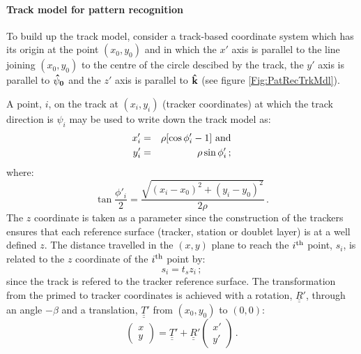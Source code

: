 \paragraph{Track model for pattern recognition}

To build up the track model, consider a track-based coordinate system
which has its origin at the point $(x_0, y_0)$ and in which the
$x'$ axis is parallel to the line joining $(x_0, y_0)$ to the
centre of the circle descibed by the track, the $y'$ axis is parallel
to ${\bf \hat{\psi}_0}$ and the $z'$ axis is parallel to 
${\bf \hat{k}}$ (see figure \ref{Fig:PatRecTrkMdl}).

A point, $i$, on the track at $(x_i, y_i)$ (tracker
coordinates) at which the track direction is $\psi_i$ may be used to
write down the track model as:
\begin{eqnarray}
  x'_i & = & \rho [ \cos\phi'_i - 1 ] {\rm~and} \\
  y'_i & = & \rho \sin\phi'_i \,;
\end{eqnarray}
where:
\begin{equation}
  \tan \frac{\phi'_i}{2} = 
                       \frac{\sqrt{(x_i - x_0)^2 + (y_i - y_0)^2}}
                       {2\rho} \, .
\end{equation}
The $z$ coordinate is taken as a parameter since the construction of
the trackers ensures that each reference surface (tracker, station or
doublet layer) is at a well defined $z$.
The distance travelled in the $(x, y)$ plane to reach the $i^{\rm th}$
point, $s_i$, is related to the $z$ coordinate of the $i^{\rm th}$
point by:
\begin{equation}
  s_i = t_s z_i \, ;
  \label{Eq:sFnz}
\end{equation}
since the track is refered to the tracker reference surface.
The transformation from the primed to tracker coordinates is achieved
with a rotation, $\underline{\underline{R}}'$, through an angle
$-\beta$ and a translation, $\underline{\underline{T}}'$ from 
$(x_0, y_0)$ to $(0, 0)$:
\begin{equation}
  \left(
      \begin{array}{cc}
         x                                                         \\
         y
      \end{array}
  \right)                 =
  \underline{\underline{T}}' + \underline{\underline{R}}'
  \left(
      \begin{array}{cc}
         x'                                                        \\
         y'
      \end{array}
  \right) \, .
\end{equation}
